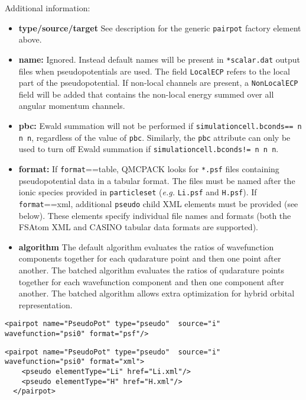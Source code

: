 Additional information:
\begin{itemize}
  \item{\textbf{type/source/target} See description for the generic \texttt{pairpot} factory element above.}
  \item{\textbf{name:} Ignored.  Instead default names will be present in \texttt{*scalar.dat} output files when pseudopotentials are used.  The field \texttt{LocalECP} refers to the local part of the pseudopotential.  If non-local channels are present, a \texttt{NonLocalECP} field will be added that contains the non-local energy summed over all angular momentum channels.}
  \item{\textbf{pbc:} Ewald summation will not be performed if \texttt{simulationcell.bconds== n n n}, regardless of the value of \texttt{pbc}.  Similarly, the \texttt{pbc} attribute can only be used to turn off Ewald summation if \texttt{simulationcell.bconds!= n n n}.}
  \item{\textbf{format:}  If \texttt{format}==table, QMCPACK looks for \texttt{*.psf} files containing pseudopotential data in a tabular format.  The files must be named after the ionic species provided in \texttt{particleset} (\emph{e.g.} \texttt{Li.psf} and \texttt{H.psf}). If \texttt{format}==xml, additional \texttt{pseudo} child XML elements must be provided (see below).  These elements specify individual file names and formats (both the FSAtom XML and CASINO tabular data formats are supported). }
  \item{\textbf{algorithm} The default algorithm evaluates the ratios of wavefunction components together for each qudarature point and then one point after another. The batched algorithm evaluates the ratios of qudarature points together for each wavefunction component and then one component after another. The batched algorithm allows extra optimization for hybrid orbital representation.}
\end{itemize}


\begin{lstlisting}[caption=XML element for pseudopotential electron-ion interaction (psf files).]
  <pairpot name="PseudoPot" type="pseudo"  source="i" wavefunction="psi0" format="psf"/>
\end{lstlisting}

\begin{lstlisting}[caption=XML element for pseudopotential electron-ion interaction (xml files).]
  <pairpot name="PseudoPot" type="pseudo"  source="i" wavefunction="psi0" format="xml">
    <pseudo elementType="Li" href="Li.xml"/>
    <pseudo elementType="H" href="H.xml"/>
  </pairpot>
\end{lstlisting}

